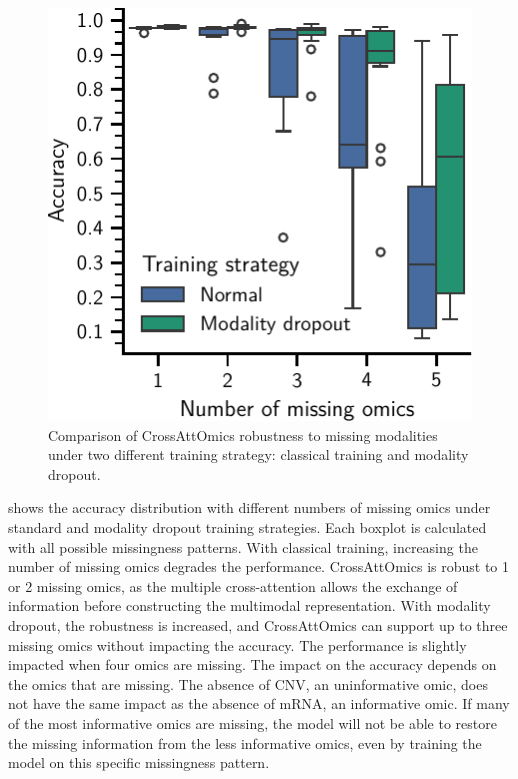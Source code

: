 \documentclass[../main.tex]{subfiles}
\begin{document}
	    \begin{figure}
	        \centering
	        \includegraphics{robustness_missing_modalities_dropout.pdf}
	        \caption[CrossAttOmics robustness to missing modalities]{Comparison of CrossAttOmics robustness to missing modalities under two different training strategy: classical training and modality dropout.}\label{fig:modality_dropout}
	    \end{figure}
	     shows the accuracy distribution with different numbers of missing omics under standard and modality dropout training strategies.
	    Each boxplot is calculated with all possible missingness patterns.
	    With classical training, increasing the number of missing omics degrades the performance.
	    CrossAttOmics is robust to 1 or 2 missing omics, as the multiple cross-attention allows the exchange of information before constructing the multimodal representation.
	    With modality dropout, the robustness is increased, and CrossAttOmics can support up to three missing omics without impacting the accuracy.
	    The performance is slightly impacted when four omics are missing.
	    The impact on the accuracy depends on the omics that are missing.
	    The absence of CNV, an uninformative omic, does not have the same impact as the absence of mRNA, an informative omic.
	    If many of the most informative omics are missing, the model will not be able to restore the missing information from the less informative omics, even by training the model on this specific missingness pattern.
\end{document}
